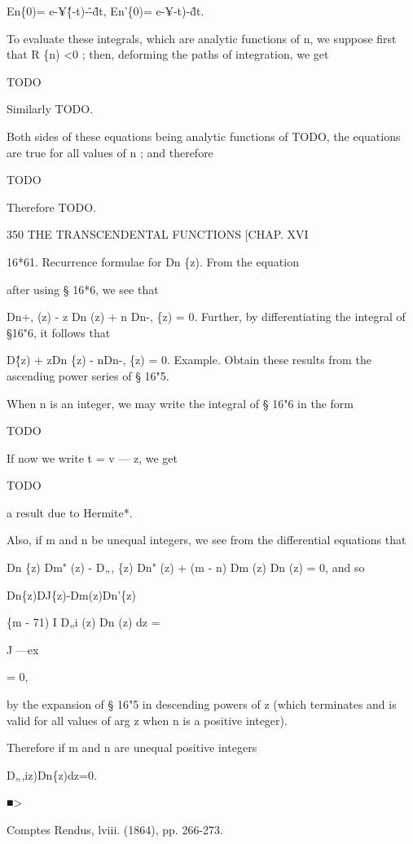 En\{0)= e-¥\^\{-t)-\^-\^dt, En'\{0)= e-¥-t)-\^dt.

To evaluate these integrals, which are analytic functions of n, we
suppose first that R \{n) <0 ; then, deforming the paths of
integration, we get

TODO

Similarly TODO.

Both sides of these equations being analytic functions of TODO, the
equations are true for all values of n ; and therefore

TODO

Therefore TODO.

350 THE TRANSCENDENTAL FUNCTIONS [CHAP. XVI

16*61. Recurrence formulae for Dn \{z). From the equation

after using § 16*6, we see that

Dn+, (z) - z Dn (z) + n Dn-, \{z) = 0. Further, by differentiating the
integral of §16"6, it follows that

D\^ \{z) + zDn \{z) - nDn-, \{z) = 0. Example. Obtain these results
from the ascendiug power series of § 16"5.


When n is an integer, we may write the integral of § 16"6 in the form

TODO

If now we write t = v — z, we get

TODO

a result due to Hermite*.

Also, if m and n be unequal integers, we see from the differential
equations that

Dn \{z) Dm" (z) - D„, \{z) Dn" (z) + (m - n) Dm (z) Dn (z) = 0, and so

Dn\{z)DJ\{z)-Dm(z)Dn'\{z)

\{m - 71) I D„i (z) Dn (z) dz =

J —ex

= 0,

by the expansion of § 16"5 in descending powers of z (which terminates
and is valid for all values of arg z when n is a positive integer).

Therefore if m and n are unequal positive integers

D„,iz)Dn\{z)dz=0.

■>

Comptes Rendus, lviii. (1864), pp. 266-273.

%
%

